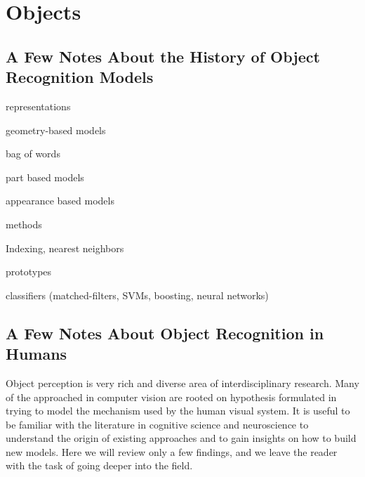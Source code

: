 %	
%	
%	 
%



\chapter{Objects}


\section{A Few Notes About the History of Object Recognition Models}


representations

geometry-based models

bag of words 

part based models

appearance based models

methods

Indexing, nearest neighbors

prototypes

classifiers (matched-filters, SVMs, boosting, neural networks)



\section{A Few Notes About Object Recognition in Humans}

Object perception is very rich and diverse area of interdisciplinary research. Many of the approached in computer vision are rooted on hypothesis formulated in trying to model the mechanism used by the human visual system. It is useful to be familiar with the literature in cognitive science and neuroscience to understand the origin of existing approaches and to gain insights on how to build new models. Here we will review only a few findings, and we leave the reader with the task of going deeper into the field. 


